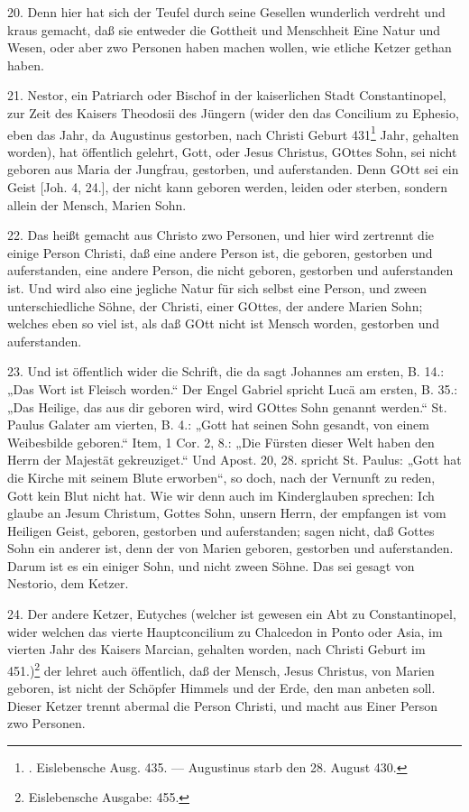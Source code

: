 20. Denn hier hat sich der Teufel durch seine Gesellen wunderlich verdreht und kraus gemacht, daß sie entweder die Gottheit und Menschheit Eine Natur und Wesen, oder aber zwo Personen haben machen wollen, wie etliche Ketzer gethan haben.

21. Nestor, ein Patriarch oder Bischof in der kaiserlichen Stadt Constantinopel, zur Zeit des Kaisers Theodosii des Jüngern (wider den das Concilium zu Ephesio, eben das Jahr, da Augustinus gestorben, nach Christi Geburt 431\footnote{. Eislebensche Ausg. 435. — Augustinus starb den 28. August 430.} Jahr, gehalten worden), hat öffentlich gelehrt, Gott, oder Jesus Christus, GOttes Sohn, sei nicht geboren aus Maria der Jungfrau, gestorben, und auferstanden. Denn GOtt sei ein Geist [Joh. 4, 24.], der nicht kann geboren werden, leiden oder sterben, sondern allein der Mensch, Marien Sohn.

22. Das heißt gemacht aus Christo zwo Personen, und hier wird zertrennt die einige Person Christi, daß eine andere Person ist, die geboren, gestorben und auferstanden, eine andere Person, die nicht geboren, gestorben und auferstanden ist. Und wird also eine jegliche Natur für sich selbst eine Person, und zween unterschiedliche Söhne, der Christi, einer GOttes, der andere Marien Sohn; welches eben so viel ist, als daß GOtt nicht ist Mensch worden, gestorben und auferstanden.

23. Und ist öffentlich wider die Schrift, die da sagt Johannes am ersten, B. 14.: „Das Wort ist Fleisch worden.“ Der Engel Gabriel spricht Lucä am ersten, B. 35.: „Das Heilige, das aus dir geboren wird, wird GOttes Sohn genannt werden.“ St. Paulus Galater am vierten,
B. 4.: „Gott hat seinen Sohn gesandt, von einem Weibesbilde geboren.“ Item, 1 Cor. 2, 8.: „Die Fürsten dieser Welt haben den Herrn der Majestät gekreuziget.“ Und Apost. 20, 28. spricht St. Paulus: „Gott hat die Kirche mit seinem Blute erworben“, so doch, nach der Vernunft zu reden, Gott kein Blut nicht hat. Wie wir denn auch im Kinderglauben sprechen: Ich glaube an Jesum Christum, Gottes Sohn, unsern Herrn, der empfangen ist vom Heiligen Geist, geboren, gestorben und auferstanden; sagen nicht, daß Gottes Sohn ein anderer ist, denn der von Marien geboren, gestorben und auferstanden. Darum ist es ein einiger Sohn, und nicht zween Söhne. Das sei gesagt von Nestorio, dem Ketzer.

24. Der andere Ketzer, Eutyches (welcher ist gewesen ein Abt zu Constantinopel, wider welchen das vierte Hauptconcilium zu Chalcedon in Ponto oder Asia, im vierten Jahr des Kaisers Marcian, gehalten worden, nach Christi Geburt im 451.)\footnote{Eislebensche Ausgabe: 455.} der lehret auch öffentlich, daß der Mensch, Jesus Christus, von Marien geboren, ist nicht der Schöpfer Himmels und der Erde, den man anbeten soll. Dieser Ketzer trennt abermal die Person Christi, und macht aus Einer Person zwo Personen.

